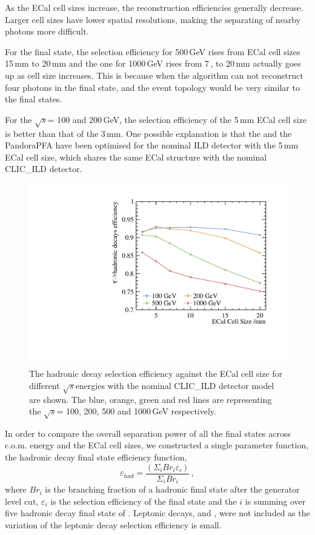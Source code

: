 \documentclass[a4paper,11pt]{article}
\newcommand{\decayElectron}{\Pem\PAGne\PGnGt}
\newcommand{\decayMuon}{\PGpm\PAGnGm\PGnGt}
\newcommand{\decayRho}{\PGrP{\PGpm\PGpz}\PGnGt}
\newcommand{\decayAiPhoton}{\PaDoP{\PGpm\PGpz\PGpz}\PGnGt}
\newcommand{\rootS}{\ensuremath{\sqrt{s}}}
\begin{document}
As the ECal cell sizes increase, the reconstruction efficiencies generally decrease. Larger cell sizes have lower spatial resolutions, making the separating of nearby photons more difficult.

For the \decayAiPhoton final state, the selection efficiency for 500\,GeV rises from ECal cell sizes 15\,mm to 20\,mm and the one for 1000\,GeV rises from 7\,, to 20\,mm actually goes up as cell size increases. This is because when the algorithm can not reconstruct four photons in the \decayAiPhoton final state, and the event topology would be very similar to the \decayRho final states. 

For the \rootS = 100 and 200\,GeV, the selection efficiency of the 5\,mm ECal cell size is better than that of the 3\,mm. One possible explanation is that the  and the PandoraPFA have been optimised for the nominal ILD detector with the 5\,mm ECal cell size, which shares the same ECal structure with the nominal CLIC\_ILD detector.

\begin{figure}[htbp]
\centering %
\includegraphics[width=.45\textwidth]{plots/hadronicEff}
\caption{\label{fig:hadronic_efficiency} The \PGt hadronic decay selection efficiency against the ECal cell size for different \rootS energies with the nominal CLIC\_ILD detector model are shown. The blue, orange, green and red lines are representing the \rootS = 100, 200, 500 and 1000\,GeV respectively.}
\end{figure}

In order to compare the overall separation power of all the final states across c.o.m. energy and the ECal cell sizes, we constructed a single parameter function, the  \PGt hadronic decay final state efficiency function, 
\begin{equation}
\label{eq:had}
\varepsilon_{had} = \frac{\left(\Sigma_{i} {Br}_{i}\varepsilon_{i}\right)}{\Sigma_{i} {Br}_{i}}  \,,
\end{equation}
where $Br_{i}$ is the branching fraction of a hadronic final state after the generator level cut, $\varepsilon_{i}$ is the selection efficiency of the final state and the $i$ is summing over five hadronic decay final state of \PGt. Leptonic decays, \decayElectron and \decayMuon, were not included as the variation of the leptonic decay selection efficiency is small.
\end{document}
